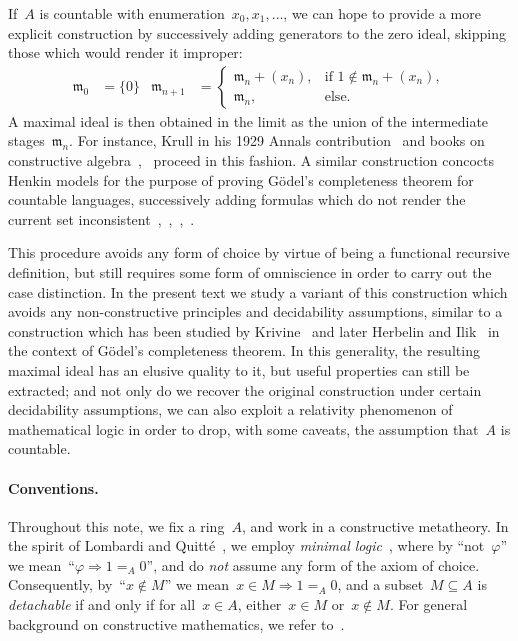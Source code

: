 \documentclass[envcountsect,envcountsame,runningheads]{llncs}
\newcommand{\mmm}{\mathfrak{m}}
\renewcommand{\_}{\mathpunct{.}\,}
\begin{document}
If~$A$ is countable with enumeration~$x_0,x_1,\ldots$, we can hope to provide a
more explicit construction by successively adding generators to the zero ideal,
skipping those which would render it improper:
\begin{align*}
  \mmm_0 &= \{ 0 \} &
  \mmm_{n+1} &= \begin{cases}
    \mmm_n + (x_n), & \text{if $1 \not\in \mmm_n + (x_n)$}, \\
    \mmm_n, & \text{else.}
  \end{cases}
\end{align*}
A maximal ideal is then obtained in the limit as the union of the intermediate
stages~$\mmm_n$. For instance, Krull in his 1929 Annals contribution~\cite[Hilfssatz]{krull:ohne} and books on constructive
algebra~\cite[Lemma~VI.3.2]{mines-richman-ruitenburg:constructive-algebra},~\cite[comment after Theorem~VII.5.2]{lombardi-quitte:constructive-algebra} proceed in this fashion.
A similar
construction concocts Henkin models for the purpose of proving
Gödel's completeness theorem for countable languages, successively adding
formulas which do not render the current set
inconsistent~\cite[Satz~I.56]{tarski:fundamental},~\cite[Lemma~1.5.7]{dalen:logic},~\cite[Lemma~III.5.4]{simpson:subsystems},~\cite[Lemma~2.1]{ishihara-khoussainov-nerode:decidable-kripke-models}.

This procedure avoids any form of choice by virtue of being a
functional recursive definition, but still requires some form of omniscience in
order to carry out the case distinction.
In the present text we study a variant of this construction which
avoids any non-constructive principles and decidability assumptions, similar to
a construction which has been studied by
Krivine~\cite[p.~410]{krivine:completeness} and later Herbelin and
Ilik~\cite[p.~11]{herbelin-ilik:henkin} in the
context of Gödel's completeness theorem. In this generality, the resulting
maximal ideal has an elusive quality to it, but useful properties can still be
extracted; and not only do we recover the original construction under certain
decidability assumptions, we can also exploit a relativity phenomenon of
mathematical logic in order to drop, with some caveats, the assumption that~$A$ is countable.

\paragraph{Conventions.} Throughout this note, we fix a ring~$A$, and work in a constructive metatheory.
In the spirit of Lombardi and Quitté~\cite{lombardi-quitte:constructive-algebra}, we employ \emph{minimal
logic}~\cite{johansson:minimal}, where by ``not~$\varphi$'' we mean~``$\varphi \Rightarrow 1 =_A 0$'', and do \emph{not} assume any form of the axiom of choice. Consequently,
by~``$x \not\in M$'' we mean~$x \in M \Rightarrow 1 =_A 0$, and a subset~$M
\subseteq A$ is \emph{detachable} if and only if for all~$x \in A$, either~$x \in M$
or~$x \not\in M$. For general background on constructive mathematics, we refer
to~\cite{bauer:five-stages,bauer:int-mathematics,sep:constructive-mathematics}.
\end{document}
